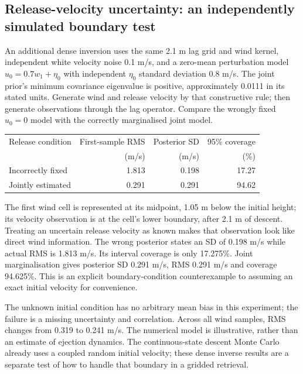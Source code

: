 \documentclass[11pt,a4paper]{article}
\numberwithin{equation}{section}
\begin{document}
\subsection{Release-velocity uncertainty: an independently simulated boundary test}
An additional dense inversion uses the same 2.1 m lag grid and wind kernel, independent white velocity noise 0.1 m/s, and a zero-mean perturbation model $u_0=0.7w_1+\eta_0$ with independent $\eta_0$ standard deviation 0.8 m/s. The joint prior's minimum covariance eigenvalue is positive, approximately 0.0111 in its stated units. Generate wind and release velocity by that constructive rule; then generate observations through the lag operator. Compare the wrongly fixed $u_0=0$ model with the correctly marginalised joint model.
\begin{center}
\begin{tabular}{lrrr}
\toprule
Release condition & First-sample RMS & Posterior SD & 95\% coverage\\
 & (m/s) & (m/s) & (\%)\\
\midrule
Incorrectly fixed & 1.813 & 0.198 & 17.27\\
Jointly estimated & 0.291 & 0.291 & 94.62\\
\bottomrule
\end{tabular}
\end{center}
The first wind cell is represented at its midpoint, 1.05 m below the initial height; its velocity observation is at the cell's lower boundary, after 2.1 m of descent. Treating an uncertain release velocity as known makes that observation look like direct wind information. The wrong posterior states an SD of 0.198 m/s while actual RMS is 1.813 m/s. Its interval coverage is only 17.275\%. Joint marginalisation gives posterior SD 0.291 m/s, RMS 0.291 m/s and coverage 94.625\%. This is an explicit boundary-condition counterexample to assuming an exact initial velocity for convenience.

The unknown initial condition has no arbitrary mean bias in this experiment; the failure is a missing uncertainty and correlation. Across all wind samples, RMS changes from 0.319 to 0.241 m/s. The numerical model is illustrative, rather than an estimate of ejection dynamics. The continuous-state descent Monte Carlo already uses a coupled random initial velocity; these dense inverse results are a separate test of how to handle that boundary in a gridded retrieval.
\end{document}

